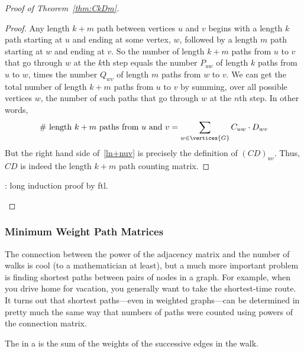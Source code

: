 \begin{proof}[Proof of Theorem~\ref{thm:CkDm}]
\begin{editingnotes}
\end{editingnotes}

\begin{proof}
  Any length $k+m$ path between vertices $u$ and $v$ begins with a
  length $k$ path starting at $u$ and ending at some vertex,
  $w$, followed by a length $m$ path starting at $w$ and ending at $v$.  So
  the number of length $k+m$ paths from $u$ to $v$ that go through
  $w$ at the $k$th step equals the number $P_{uw}$ of length $k$ paths
  from $u$ to $w$, times the number $Q_{wv}$ of length $m$ paths from $w$
  to $v$.  We can get the total number of length $k+m$ paths from $u$
  to $v$ by summing, over all possible vertices $w$, the number of such
  paths that go through $w$ at the $n$th step.  In other words,
\begin{equation}\label{ln+nuv}
\text{\# length $k+m$ paths from $u$ and $v$} =
              \sum_{w \in \vertices{G}} C_{uw}\cdot D_{wv}
\end{equation}
But the right hand side of~\eqref{ln+nuv} is precisely the definition of
$(CD)_{uv}$.  Thus, $CD$ is indeed the length $k+m$ path counting matrix.

\end{proof}

\begin{editingnotes}
:  long induction proof by ftl.
\end{editingnotes}

\end{proof}

\subsubsection{Minimum Weight Path  Matrices}
The connection between the power of the adjacency matrix and the number of
walks is cool (to a mathematician at least), but a much more important
problem is finding  shortest paths between
pairs of nodes in a graph.  For example, when you drive home for vacation,
you generally want to take the shortest-time route.  It turns out that
shortest paths---even in weighted graphs---can be determined in pretty
much the same way that numbers of paths were counted using powers of the
connection matrix.

\begin{definition}\label{def:5H}
  The   in a  is the sum of the weights of
  the successive edges in the walk.
\end{definition}


